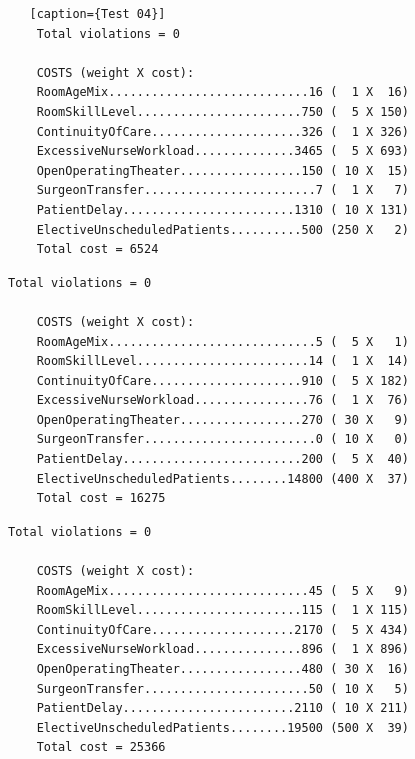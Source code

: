 \begin{lstlisting}   [caption={Test 04}]
    Total violations = 0
    
    COSTS (weight X cost): 
    RoomAgeMix............................16 (  1 X  16)
    RoomSkillLevel.......................750 (  5 X 150)
    ContinuityOfCare.....................326 (  1 X 326)
    ExcessiveNurseWorkload..............3465 (  5 X 693)
    OpenOperatingTheater.................150 ( 10 X  15)
    SurgeonTransfer........................7 (  1 X   7)
    PatientDelay........................1310 ( 10 X 131)
    ElectiveUnscheduledPatients..........500 (250 X   2)
    Total cost = 6524
\end{lstlisting}

\begin{lstlisting}[caption={Text 05}]
    Total violations = 0

    COSTS (weight X cost): 
    RoomAgeMix.............................5 (  5 X   1)
    RoomSkillLevel........................14 (  1 X  14)
    ContinuityOfCare.....................910 (  5 X 182)
    ExcessiveNurseWorkload................76 (  1 X  76)
    OpenOperatingTheater.................270 ( 30 X   9)
    SurgeonTransfer........................0 ( 10 X   0)
    PatientDelay.........................200 (  5 X  40)
    ElectiveUnscheduledPatients........14800 (400 X  37)
    Total cost = 16275
\end{lstlisting}

\begin{lstlisting}[caption={Test 06}]
    Total violations = 0

    COSTS (weight X cost): 
    RoomAgeMix............................45 (  5 X   9)
    RoomSkillLevel.......................115 (  1 X 115)
    ContinuityOfCare....................2170 (  5 X 434)
    ExcessiveNurseWorkload...............896 (  1 X 896)
    OpenOperatingTheater.................480 ( 30 X  16)
    SurgeonTransfer.......................50 ( 10 X   5)
    PatientDelay........................2110 ( 10 X 211)
    ElectiveUnscheduledPatients........19500 (500 X  39)
    Total cost = 25366
\end{lstlisting}
\newpage
